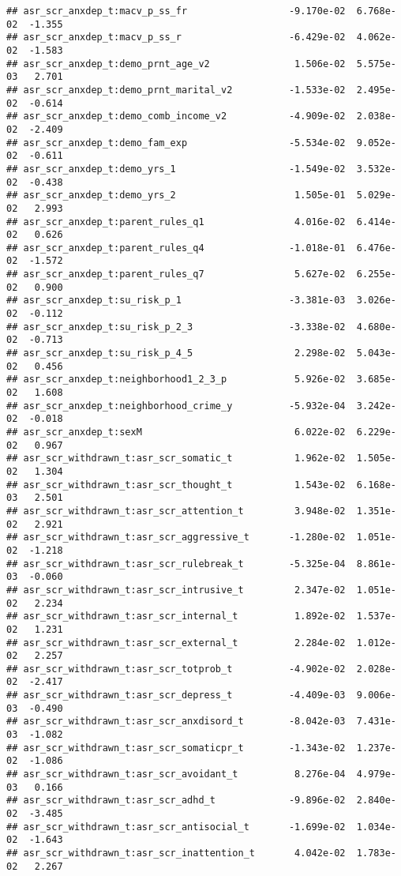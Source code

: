 \documentclass[
]{article}
\begin{document}
\begin{verbatim}
## asr_scr_anxdep_t:macv_p_ss_fr                  -9.170e-02  6.768e-02  -1.355
## asr_scr_anxdep_t:macv_p_ss_r                   -6.429e-02  4.062e-02  -1.583
## asr_scr_anxdep_t:demo_prnt_age_v2               1.506e-02  5.575e-03   2.701
## asr_scr_anxdep_t:demo_prnt_marital_v2          -1.533e-02  2.495e-02  -0.614
## asr_scr_anxdep_t:demo_comb_income_v2           -4.909e-02  2.038e-02  -2.409
## asr_scr_anxdep_t:demo_fam_exp                  -5.534e-02  9.052e-02  -0.611
## asr_scr_anxdep_t:demo_yrs_1                    -1.549e-02  3.532e-02  -0.438
## asr_scr_anxdep_t:demo_yrs_2                     1.505e-01  5.029e-02   2.993
## asr_scr_anxdep_t:parent_rules_q1                4.016e-02  6.414e-02   0.626
## asr_scr_anxdep_t:parent_rules_q4               -1.018e-01  6.476e-02  -1.572
## asr_scr_anxdep_t:parent_rules_q7                5.627e-02  6.255e-02   0.900
## asr_scr_anxdep_t:su_risk_p_1                   -3.381e-03  3.026e-02  -0.112
## asr_scr_anxdep_t:su_risk_p_2_3                 -3.338e-02  4.680e-02  -0.713
## asr_scr_anxdep_t:su_risk_p_4_5                  2.298e-02  5.043e-02   0.456
## asr_scr_anxdep_t:neighborhood1_2_3_p            5.926e-02  3.685e-02   1.608
## asr_scr_anxdep_t:neighborhood_crime_y          -5.932e-04  3.242e-02  -0.018
## asr_scr_anxdep_t:sexM                           6.022e-02  6.229e-02   0.967
## asr_scr_withdrawn_t:asr_scr_somatic_t           1.962e-02  1.505e-02   1.304
## asr_scr_withdrawn_t:asr_scr_thought_t           1.543e-02  6.168e-03   2.501
## asr_scr_withdrawn_t:asr_scr_attention_t         3.948e-02  1.351e-02   2.921
## asr_scr_withdrawn_t:asr_scr_aggressive_t       -1.280e-02  1.051e-02  -1.218
## asr_scr_withdrawn_t:asr_scr_rulebreak_t        -5.325e-04  8.861e-03  -0.060
## asr_scr_withdrawn_t:asr_scr_intrusive_t         2.347e-02  1.051e-02   2.234
## asr_scr_withdrawn_t:asr_scr_internal_t          1.892e-02  1.537e-02   1.231
## asr_scr_withdrawn_t:asr_scr_external_t          2.284e-02  1.012e-02   2.257
## asr_scr_withdrawn_t:asr_scr_totprob_t          -4.902e-02  2.028e-02  -2.417
## asr_scr_withdrawn_t:asr_scr_depress_t          -4.409e-03  9.006e-03  -0.490
## asr_scr_withdrawn_t:asr_scr_anxdisord_t        -8.042e-03  7.431e-03  -1.082
## asr_scr_withdrawn_t:asr_scr_somaticpr_t        -1.343e-02  1.237e-02  -1.086
## asr_scr_withdrawn_t:asr_scr_avoidant_t          8.276e-04  4.979e-03   0.166
## asr_scr_withdrawn_t:asr_scr_adhd_t             -9.896e-02  2.840e-02  -3.485
## asr_scr_withdrawn_t:asr_scr_antisocial_t       -1.699e-02  1.034e-02  -1.643
## asr_scr_withdrawn_t:asr_scr_inattention_t       4.042e-02  1.783e-02   2.267

\end{verbatim}
\end{document}
